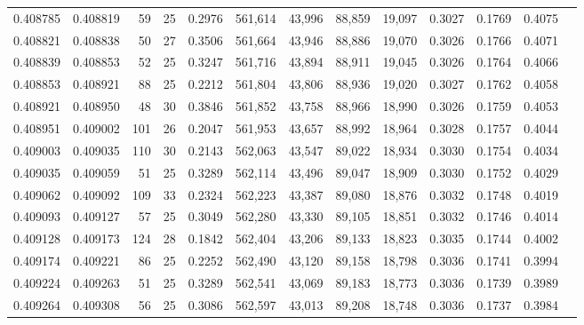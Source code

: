 \begin{tabular}{rrrrrrrrrrrrr}
0.408785 & 0.408819 &    59 &  25 &                                     0.2976 & 561,614 &  43,996 &  88,859 &  19,097 & 0.3027 & 0.1769 & 0.4075 \\
0.408821 & 0.408838 &    50 &  27 &                                     0.3506 & 561,664 &  43,946 &  88,886 &  19,070 & 0.3026 & 0.1766 & 0.4071 \\
0.408839 & 0.408853 &    52 &  25 &                                     0.3247 & 561,716 &  43,894 &  88,911 &  19,045 & 0.3026 & 0.1764 & 0.4066 \\
0.408853 & 0.408921 &    88 &  25 &                                     0.2212 & 561,804 &  43,806 &  88,936 &  19,020 & 0.3027 & 0.1762 & 0.4058 \\
0.408921 & 0.408950 &    48 &  30 &                                     0.3846 & 561,852 &  43,758 &  88,966 &  18,990 & 0.3026 & 0.1759 & 0.4053 \\
0.408951 & 0.409002 &   101 &  26 &                                     0.2047 & 561,953 &  43,657 &  88,992 &  18,964 & 0.3028 & 0.1757 & 0.4044 \\
0.409003 & 0.409035 &   110 &  30 &                                     0.2143 & 562,063 &  43,547 &  89,022 &  18,934 & 0.3030 & 0.1754 & 0.4034 \\
0.409035 & 0.409059 &    51 &  25 &                                     0.3289 & 562,114 &  43,496 &  89,047 &  18,909 & 0.3030 & 0.1752 & 0.4029 \\
0.409062 & 0.409092 &   109 &  33 &                                     0.2324 & 562,223 &  43,387 &  89,080 &  18,876 & 0.3032 & 0.1748 & 0.4019 \\
0.409093 & 0.409127 &    57 &  25 &                                     0.3049 & 562,280 &  43,330 &  89,105 &  18,851 & 0.3032 & 0.1746 & 0.4014 \\
0.409128 & 0.409173 &   124 &  28 &                                     0.1842 & 562,404 &  43,206 &  89,133 &  18,823 & 0.3035 & 0.1744 & 0.4002 \\
0.409174 & 0.409221 &    86 &  25 &                                     0.2252 & 562,490 &  43,120 &  89,158 &  18,798 & 0.3036 & 0.1741 & 0.3994 \\
0.409224 & 0.409263 &    51 &  25 &                                     0.3289 & 562,541 &  43,069 &  89,183 &  18,773 & 0.3036 & 0.1739 & 0.3989 \\
0.409264 & 0.409308 &    56 &  25 &                                     0.3086 & 562,597 &  43,013 &  89,208 &  18,748 & 0.3036 & 0.1737 & 0.3984 \\

\end{tabular}
